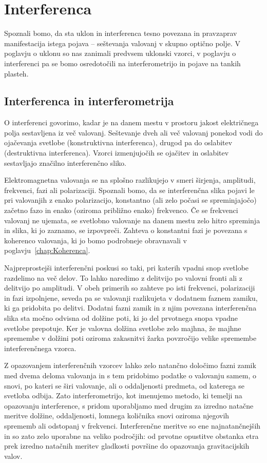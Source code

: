 
\chapter{Interferenca}
Spoznali bomo, da sta uklon in interferenca tesno povezana in pravzaprav
manifestacija istega pojava -- seštevanja  valovanj v 
skupno optično polje. V poglavju o uklonu so nas zanimali predvsem uklonski 
vzorci, v poglavju o interferenci pa se bomo osredotočili na interferometrijo 
in pojave na tankih plasteh.

\section{Interferenca in interferometrija}
O interferenci govorimo, kadar je na danem mestu v 
prostoru jakost električnega polja sestavljena iz 
več valovanj. Seštevanje 
dveh ali več valovanj ponekod vodi
do ojačevanja svetlobe (konstruktivna interferenca), 
drugod pa do oslabitev (destruktivna interferenca). 
Vzorci izmenjujočih se ojačitev in oslabitev sestavljajo
značilno interferenčno sliko.

Elektromagnetna valovanja se na splošno razlikujejo 
v smeri širjenja, amplitudi, frekvenci, fazi ali polarizaciji. 
Spoznali bomo, da se interferenčna slika pojavi le pri valovanjih z enako
polarizacijo, konstantno (ali zelo počasi se spreminjajočo)
začetno fazo in enako (oziroma približno enako) frekvenco. 
Če se frekvenci valovanj ne ujemata, se svetlobno valovanje na 
danem mestu zelo hitro spreminja in slika, ki jo zaznamo, se izpovpreči.
Zahteva o konstantni fazi je povezana s koherenco valovanja, 
ki jo bomo podrobneje obravnavali v poglavju~\ref{chap:Koherenca}. 

Najpreprostejši interferenčni poskusi so taki, pri katerih vpadni snop svetlobe
razdelimo na več delov. To lahko naredimo z delitvijo po valovni fronti
ali z delitvijo po amplitudi. V obeh primerih so zahteve po isti frekvenci, 
polarizaciji in fazi izpolnjene, seveda pa se valovanji razlikujeta 
v dodatnem faznem zamiku, ki ga pridobita po delitvi.
Dodatni fazni zamik in z njim povezana interferenčna slika 
sta močno odvisna od dolžine poti, ki jo del prvotnega snopa 
vpadne svetlobe prepotuje. Ker je valovna dolžina svetlobe zelo majhna, že majhne 
spremembe v dolžini poti oziroma zakasnitvi žarka povzročijo velike spremembe 
interferenčnega vzorca. 

Z opazovanjem interferenčnih vzorcev lahko zelo natančno določimo fazni zamik med
dvema deloma valovanja in s tem pridobimo podatke o valovanju samem, o snovi, po 
kateri se širi valovanje, ali o oddaljenosti predmeta, od katerega se svetloba odbija. 
Zato interferometrijo, kot imenujemo metodo, ki temelji na opazovanju interference,
s pridom uporabljamo med drugim za izredno natačne meritve dolžine, 
oddaljenosti, lomnega količnika snovi oziroma njegovih sprememb ali odstopanj v frekvenci. 
Interferenčne meritve so ene najnatančnejših in so zato zelo uporabne na veliko področjih:
od prvotne opustitve obstanka etra prek izredno natačnih meritev gladkosti površine do
opazovanja gravitacijskih valov. 

